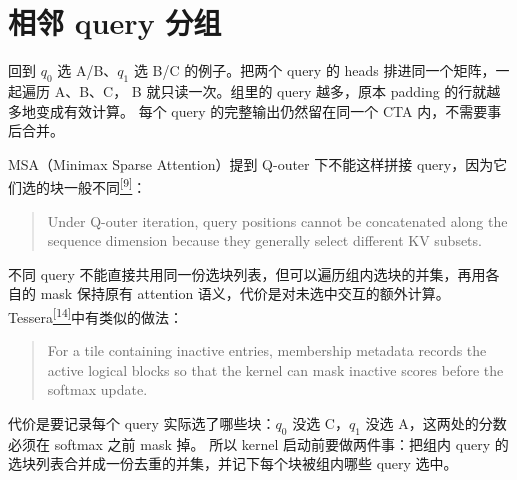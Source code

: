 \section{相邻 query 分组}

回到 $q_0$ 选 A/B、$q_1$ 选 B/C 的例子。把两个 query 的 heads 排进同一个矩阵，一起遍历 A、B、C， B 就只读一次。组里的 query 越多，原本 padding 的行就越多地变成有效计算。 每个 query 的完整输出仍然留在同一个 CTA 内，不需要事后合并。

MSA（Minimax Sparse Attention）提到 Q-outer 下不能这样拼接 query，因为它们选的块一般不同\hyperlink{ref-9}{\textsuperscript{[9]}}：

\begin{quote}\small
Under Q-outer iteration, query positions cannot be concatenated along the sequence dimension because they generally select different KV subsets.
\end{quote}

不同 query 不能直接共用同一份选块列表，但可以遍历组内选块的并集，再用各自的 mask 保持原有 attention 语义，代价是对未选中交互的额外计算。Tessera\hyperlink{ref-14}{\textsuperscript{[14]}}中有类似的做法：

\begin{quote}\small
For a tile containing inactive entries, membership metadata records the active logical blocks so that the kernel can mask inactive scores before the softmax update.
\end{quote}

代价是要记录每个 query 实际选了哪些块：$q_0$ 没选 C，$q_1$ 没选 A，这两处的分数必须在 softmax 之前 mask 掉。 所以 kernel 启动前要做两件事：把组内 query 的选块列表合并成一份去重的并集，并记下每个块被组内哪些 query 选中。

